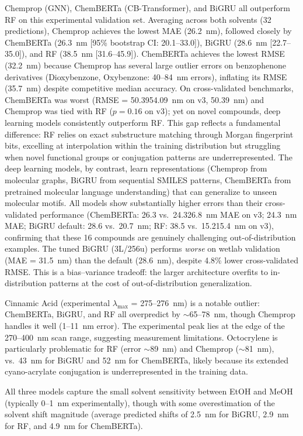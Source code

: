 \documentclass[journal=jcisd8,manuscript=article]{achemso}
\newcommand{\added}[1]{{\color{addedblue}#1}}
\newcommand{\removed}[1]{{\color{removedred}#1}}
\begin{document}
Chemprop (GNN), ChemBERTa (CB-Transformer), and BiGRU all outperform RF on this experimental validation set. Averaging across both solvents (32 predictions), Chemprop achieves the lowest MAE (26.2~nm), followed closely by ChemBERTa (26.3~nm [95\% bootstrap CI: 20.1--33.0]), BiGRU (28.6~nm [22.7--35.0]), and RF (38.5~nm [31.6--45.9]).
ChemBERTa achieves the lowest RMSE (32.2~nm) because Chemprop has several large outlier errors on benzophenone derivatives (Dioxybenzone, Oxybenzone: 40--84~nm errors), inflating its RMSE (35.7~nm) despite competitive median accuracy.
On cross-validated benchmarks, ChemBERTa was worst (RMSE = \removed{50.39}\added{54.09~nm on v3, 50.39}~nm) and Chemprop was tied with RF\added{ ($p = 0.16$ on v3)}; yet on novel compounds, deep learning models consistently outperform RF.
This gap reflects a fundamental difference: RF relies on exact substructure matching through Morgan fingerprint bits, excelling at interpolation within the training distribution but struggling when novel functional groups or conjugation patterns are underrepresented.
The deep learning models, by contrast, learn representations (Chemprop from molecular graphs, BiGRU from sequential SMILES patterns, ChemBERTa from pretrained molecular language understanding) that can generalize to unseen molecular motifs.
All models show substantially higher errors than their cross-validated performance (ChemBERTa: 26.3 vs.\ \removed{24.3}\added{26.8~nm MAE on v3; 24.3}~nm MAE; BiGRU default: 28.6 vs.\ 20.7~nm; RF: 38.5 vs.\ \removed{15.2}\added{15.4}~nm \added{on v3}), confirming that these 16 compounds are genuinely challenging out-of-distribution examples.
The tuned BiGRU (3L/256u) performs \textit{worse} on wetlab validation (MAE = 31.5~nm) than the default (28.6~nm), despite 4.8\% lower cross-validated RMSE. This is a bias--variance tradeoff: the larger architecture overfits to in-distribution patterns at the cost of out-of-distribution generalization.

Cinnamic Acid (experimental $\lambda_{\max}$ = 275--276~nm) is a notable outlier: ChemBERTa, BiGRU, and RF all overpredict by $\sim$65--78~nm, though Chemprop handles it well (1--11~nm error).
The experimental peak lies at the edge of the 270--400~nm scan range, suggesting measurement limitations.
Octocrylene is particularly problematic for RF (error $\sim$89~nm) and Chemprop ($\sim$81~nm), vs.\ 43~nm for BiGRU and 52~nm for ChemBERTa, likely because its extended cyano-acrylate conjugation is underrepresented in the training data.

All three models capture the small solvent sensitivity between EtOH and MeOH (typically 0--1~nm experimentally), though with some overestimation of the solvent shift magnitude (average predicted shifts of 2.5~nm for BiGRU, 2.9~nm for RF, and 4.9~nm for ChemBERTa).
\end{document}

